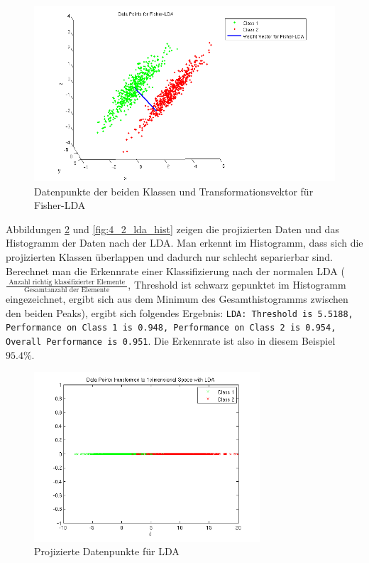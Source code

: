 \begin{figure}[hp!]
\begin{center}
 \includegraphics[width=\textwidth]{./figures/4_2_fisher_data}
 \caption{Datenpunkte der beiden Klassen und Transformationsvektor für Fisher-LDA}
\label{fig:4_2_fisher_data}
\end{center}
\end{figure}


Abbildungen \ref{fig:4_2_lda_1d} und \ref{fig:4_2_lda_hist} zeigen die projizierten Daten und das Histogramm der Daten nach der LDA. Man erkennt im Histogramm, dass sich die projizierten Klassen überlappen und dadurch nur schlecht separierbar sind. Berechnet man die Erkennrate einer Klassifizierung nach der normalen LDA ($\frac{\textrm{ Anzahl richtig klassifizierter Elemente }}{\textrm{ Gesamtanzahl der Elemente }}$, Threshold ist schwarz gepunktet im Histogramm eingezeichnet, ergibt sich aus dem Minimum des Gesamthistogramms zwischen den beiden Peaks), ergibt sich folgendes Ergebnis: \texttt{LDA: Threshold is 5.5188, Performance on Class 1 is 0.948, Performance on Class 2 is 0.954, Overall Performance is 0.951}. Die Erkennrate ist also in diesem Beispiel $95.4\%$.

\begin{figure}[hp!]
\begin{center}
 \includegraphics[width=0.75\textwidth]{./figures/4_2_lda_1d}
 \caption{Projizierte Datenpunkte für LDA}
\label{fig:4_2_lda_1d}
\end{center}
\end{figure}

